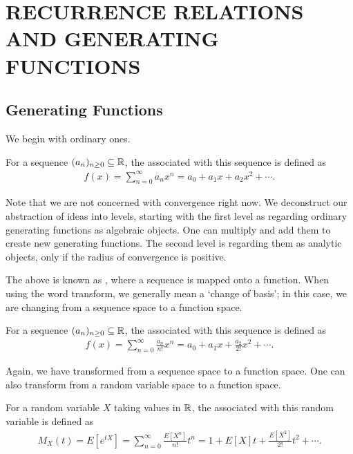 \chapter{RECURRENCE RELATIONS AND GENERATING FUNCTIONS}

\section{Generating Functions}
We begin with ordinary ones.

\begin{definition}
    For a sequence $(a_{n})_{n \geq 0} \subseteq \mathbb{R}$, the  associated with this sequence is defined as
    \begin{align}
        f(x) = \sum_{n=0}^{\infty} a_{n} x^{n} = a_{0} + a_{1}x + a_{2}x^{2} + \cdots.
    \end{align}
\end{definition}
Note that we are not concerned with convergence right now. We deconstruct our abstraction of ideas into levels, starting with the first level as regarding ordinary generating functions as algebraic objects. One can multiply and add them to create new generating functions. The second level is regarding them as analytic objects, only if the radius of convergence is positive. 

The above is known as , where a sequence is mapped onto a function. When using the word transform, we generally mean a `change of basis'; in this case, we are changing from a sequence space to a function space.

\begin{definition}
    For a sequence $(a_{n})_{n \geq 0} \subseteq \mathbb{R}$, the  associated with this sequence is defined as
    \begin{align}
        f(x) = \sum_{n=0}^{\infty} \frac{a_{n}}{n!} x^{n} = a_{0} + a_{1}x + \frac{a_{2}}{2!}x^{2} + \cdots.
    \end{align}
\end{definition}

Again, we have transformed from a sequence space to a function space. One can also transform from a random variable space to a function space.

\begin{definition}
    For a random variable $X$ taking values in $\mathbb{R}$, the  associated with this random variable is defined as
    \begin{align}
        M_{X}(t) = E[e^{tX}] = \sum_{n=0}^{\infty} \frac{E[X^{n}]}{n!} t^{n} = 1 + E[X]t + \frac{E[X^{2}]}{2!}t^{2} + \cdots.
    \end{align}
\end{definition}

